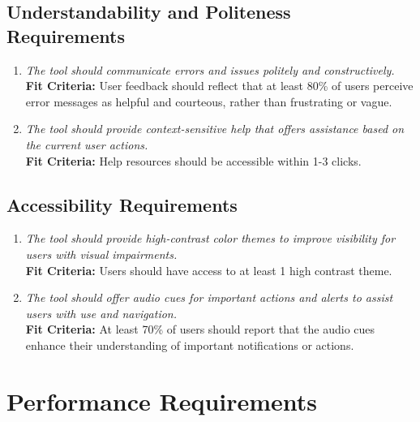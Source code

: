 \documentclass[12pt]{article}
\begin{document}
\subsection{Understandability and Politeness Requirements}
\begin{enumerate}[label=LF-UPL \arabic*., wide=0pt, leftmargin=*]
  \item \emph{The tool should communicate errors and issues politely and constructively.}\\
  {\bf Fit Criteria:} User feedback should reflect that at least 80\% of users perceive error messages as helpful and courteous, rather than frustrating or vague.
  
  \item \emph{The tool should provide context-sensitive help that offers assistance based on the current user actions.}\\
  {\bf Fit Criteria:} Help resources should be accessible within 1-3 clicks.
\end{enumerate}

\subsection{Accessibility Requirements}
\begin{enumerate}[label=LF-ACS \arabic*., wide=0pt, leftmargin=*]
  \item \emph{The tool should provide high-contrast color themes to improve visibility for users with visual impairments.}\\
  {\bf Fit Criteria:} Users should have access to at least 1 high contrast theme.
  
  \item \emph{The tool should offer audio cues for important actions and alerts to assist users with use and navigation.}\\
  {\bf Fit Criteria:} At least 70\% of users should report that the audio cues enhance their understanding of important notifications or actions.
\end{enumerate}

\section{Performance Requirements}
\end{document}
